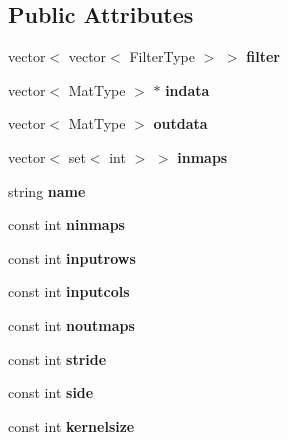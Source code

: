 \subsection*{Public Attributes}
\begin{DoxyCompactItemize}
\item 
\hypertarget{class_conv_layer_a3fbf8929ebf39d70281c548653159fe1}{vector$<$ vector$<$ Filter\+Type $>$ $>$ {\bfseries filter}}\label{class_conv_layer_a3fbf8929ebf39d70281c548653159fe1}

\item 
\hypertarget{class_conv_layer_ae90ccdaf98509ac518dc8158abb53540}{vector$<$ Mat\+Type $>$ $\ast$ {\bfseries indata}}\label{class_conv_layer_ae90ccdaf98509ac518dc8158abb53540}

\item 
\hypertarget{class_conv_layer_a41e52948623d345d93ddf7e3e6d4098c}{vector$<$ Mat\+Type $>$ {\bfseries outdata}}\label{class_conv_layer_a41e52948623d345d93ddf7e3e6d4098c}

\item 
\hypertarget{class_conv_layer_a2a829e399b291ef09856b71484ddcade}{vector$<$ set$<$ int $>$ $>$ {\bfseries inmaps}}\label{class_conv_layer_a2a829e399b291ef09856b71484ddcade}

\item 
\hypertarget{class_conv_layer_a9c41797df74c1eef60fb4fdbf2713379}{string {\bfseries name}}\label{class_conv_layer_a9c41797df74c1eef60fb4fdbf2713379}

\item 
\hypertarget{class_conv_layer_a62ef7802fa2cb90f2a6c3f09f52d1485}{const int {\bfseries ninmaps}}\label{class_conv_layer_a62ef7802fa2cb90f2a6c3f09f52d1485}

\item 
\hypertarget{class_conv_layer_a24e3feabcb086d6a9985c263b954f32e}{const int {\bfseries inputrows}}\label{class_conv_layer_a24e3feabcb086d6a9985c263b954f32e}

\item 
\hypertarget{class_conv_layer_a51c24316490e75baea4950781a65d7f9}{const int {\bfseries inputcols}}\label{class_conv_layer_a51c24316490e75baea4950781a65d7f9}

\item 
\hypertarget{class_conv_layer_a5b16865e198761926c2f4820062b0766}{const int {\bfseries noutmaps}}\label{class_conv_layer_a5b16865e198761926c2f4820062b0766}

\item 
\hypertarget{class_conv_layer_a503460202a6877759475b94e8bda8aa6}{const int {\bfseries stride}}\label{class_conv_layer_a503460202a6877759475b94e8bda8aa6}

\item 
\hypertarget{class_conv_layer_aa393a1694d13a8d62f3eddc1709e5b74}{const int {\bfseries side}}\label{class_conv_layer_aa393a1694d13a8d62f3eddc1709e5b74}

\item 
\hypertarget{class_conv_layer_ad0f8a1eab56d2db1309913de2b299fc9}{const int {\bfseries kernelsize}}\label{class_conv_layer_ad0f8a1eab56d2db1309913de2b299fc9}

\end{DoxyCompactItemize}



